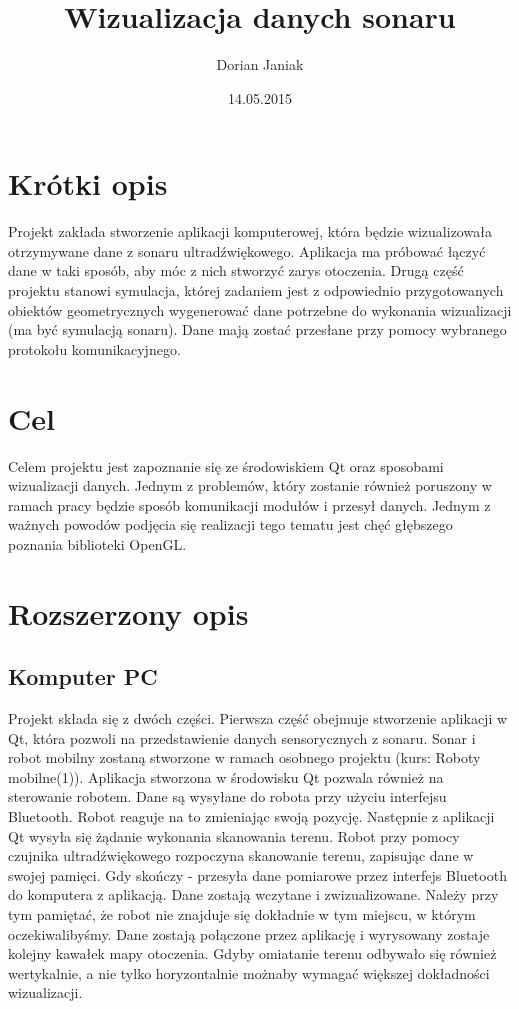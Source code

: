 \documentclass[a4paper,12pt]{article}
\title{Wizualizacja danych sonaru}
\author{Dorian Janiak}
\date{14.05.2015}
\begin{document}
\maketitle

\section{Krótki opis}
Projekt zakłada stworzenie aplikacji komputerowej, która będzie wizualizowała
otrzymywane dane z sonaru ultradźwiękowego. Aplikacja ma próbować łączyć dane
w taki sposób, aby móc z nich stworzyć zarys otoczenia. Drugą część projektu
stanowi symulacja, której zadaniem jest z odpowiednio przygotowanych obiektów
geometrycznych wygenerować dane potrzebne do wykonania wizualizacji 
(ma być symulacją sonaru). 
Dane mają zostać przesłane przy pomocy wybranego protokołu komunikacyjnego.

\section{Cel}
Celem projektu jest zapoznanie się ze środowiskiem Qt oraz sposobami wizualizacji danych.
Jednym z problemów, który zostanie również poruszony w ramach pracy będzie 
sposób komunikacji modułów i przesył danych. Jednym z ważnych powodów podjęcia się realizacji tego tematu
jest chęć głębszego poznania biblioteki OpenGL. 

\section{Rozszerzony opis}
\subsection{Komputer PC}
Projekt składa się z dwóch części. Pierwsza część obejmuje stworzenie aplikacji
w Qt, która pozwoli na przedstawienie danych sensorycznych z sonaru.
Sonar i robot mobilny zostaną stworzone w ramach osobnego projektu (kurs: Roboty mobilne(1)).
Aplikacja stworzona w środowisku Qt pozwala również na sterowanie robotem. 
Dane są wysyłane do robota przy użyciu interfejsu Bluetooth. Robot reaguje na to zmieniając swoją
pozycję. Następnie z aplikacji Qt wysyła się żądanie wykonania skanowania terenu. 
Robot przy pomocy czujnika ultradźwiękowego rozpoczyna skanowanie terenu, zapisując dane w
swojej pamięci. Gdy skończy - przesyła dane pomiarowe przez interfejs Bluetooth do komputera z 
aplikacją. Dane zostają wczytane i zwizualizowane. Należy przy tym pamiętać, że robot
nie znajduje się dokładnie w tym miejscu, w którym oczekiwalibyśmy. Dane zostają połączone
przez aplikację i wyrysowany zostaje kolejny kawałek mapy otoczenia. Gdyby omiatanie terenu
odbywało się również wertykalnie, a nie tylko horyzontalnie możnaby wymagać większej
dokładności wizualizacji.
\end{document}
